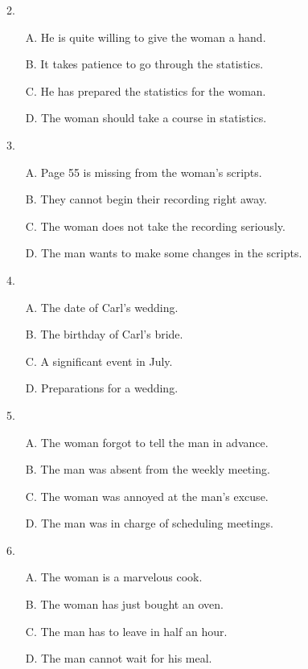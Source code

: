 \documentclass[UTF8,11pt]{ctexart}
\begin{document}
2.


\begin{itemize}[leftmargin=2em,itemsep=.2em,topsep=.4em]\item[A.] He is quite willing to give the woman a hand.
\item[B.] It takes patience to go through the statistics.
\item[C.] He has prepared the statistics for the woman.
\item[D.] The woman should take a course in statistics.
\end{itemize}

3.


\begin{itemize}[leftmargin=2em,itemsep=.2em,topsep=.4em]\item[A.] Page 55 is missing from the woman’s scripts.
\item[B.] They cannot begin their recording right away.
\item[C.] The woman does not take the recording seriously.
\item[D.] The man wants to make some changes in the scripts.
\end{itemize}

4.


\begin{itemize}[leftmargin=2em,itemsep=.2em,topsep=.4em]\item[A.] The date of Carl’s wedding.
\item[B.] The birthday of Carl’s bride.
\item[C.] A significant event in July.
\item[D.] Preparations for a wedding.
\end{itemize}

5.


\begin{itemize}[leftmargin=2em,itemsep=.2em,topsep=.4em]\item[A.] The woman forgot to tell the man in advance.
\item[B.] The man was absent from the weekly meeting.
\item[C.] The woman was annoyed at the man’s excuse.
\item[D.] The man was in charge of scheduling meetings.
\end{itemize}

6.


\begin{itemize}[leftmargin=2em,itemsep=.2em,topsep=.4em]\item[A.] The woman is a marvelous cook.
\item[B.] The woman has just bought an oven.
\item[C.] The man has to leave in half an hour.
\item[D.] The man cannot wait for his meal.
\end{itemize}
\end{document}

